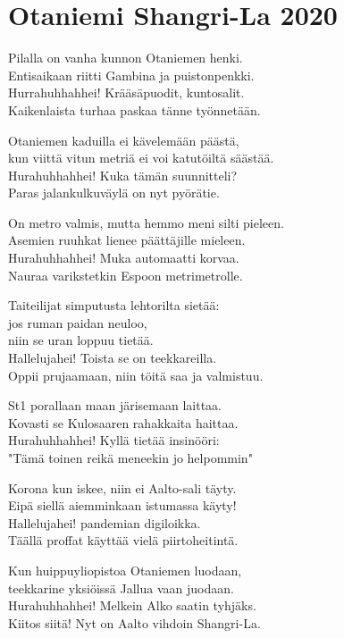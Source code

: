 \section{Otaniemi Shangri-La 2020}
Pilalla on vanha kunnon Otaniemen henki.\\
Entisaikaan riitti Gambina ja puistonpenkki.\\
Hurrahuhhahhei! Krääsäpuodit, kuntosalit.\\
Kaikenlaista turhaa paskaa tänne työnnetään.

Otaniemen kaduilla ei kävelemään päästä,\\
kun viittä vitun metriä ei voi katutöiltä säästää.\\
Hurahuhhahhei! Kuka tämän suunnitteli?\\
Paras jalankulkuväylä on nyt pyörätie.

On metro valmis, mutta hemmo meni silti pieleen.\\
Asemien ruuhkat lienee päättäjille mieleen.\\
Hurahuhhahhei! Muka automaatti korvaa.\\
Nauraa varikstetkin Espoon metrimetrolle.

Taiteilijat simputusta lehtorilta sietää:\\
jos ruman paidan neuloo,\\
niin se uran loppuu tietää.\\
Hallelujahei! Toista se on teekkareilla.\\
Oppii prujaamaan, niin töitä saa ja valmistuu.

St1 porallaan maan järisemaan laittaa.\\
Kovasti se Kulosaaren rahakkaita haittaa.\\
Hurahuhhahhei! Kyllä tietää insinööri:\\
"Tämä toinen reikä meneekin jo helpommin"

Korona kun iskee, niin ei Aalto-sali täyty.\\
Eipä siellä aiemminkaan istumassa käyty!\\
Hallelujahei! pandemian digiloikka.\\
Täällä proffat käyttää vielä piirtoheitintä.

Kun huippuyliopistoa Otaniemen luodaan,\\
teekkarine yksiöissä Jallua vaan juodaan.\\
Hurahuhhahhei! Melkein Alko saatin tyhjäks.\\
Kiitos siitä! Nyt on Aalto vihdoin Shangri-La.
